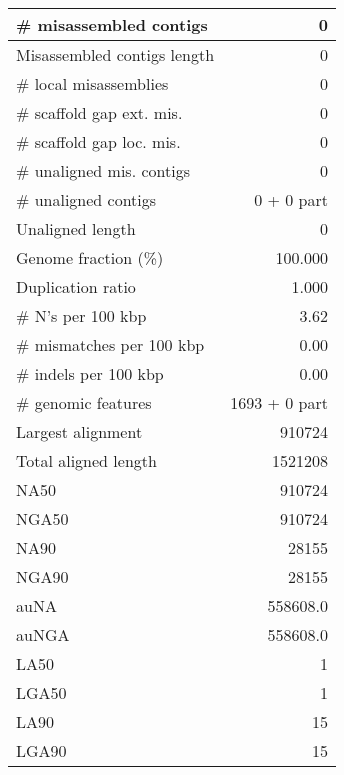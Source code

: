 \documentclass[12pt,a4paper]{article}
\begin{document}
\begin{table}[ht]
\begin{center}
\begin{tabular}{|l*{1}{|r}|}
\# misassembled contigs & 0 \\ \hline
Misassembled contigs length & 0 \\ \hline
\# local misassemblies & 0 \\ \hline
\# scaffold gap ext. mis. & 0 \\ \hline
\# scaffold gap loc. mis. & 0 \\ \hline
\# unaligned mis. contigs & 0 \\ \hline
\# unaligned contigs & 0 + 0 part \\ \hline
Unaligned length & 0 \\ \hline
Genome fraction (\%) & 100.000 \\ \hline
Duplication ratio & 1.000 \\ \hline
\# N's per 100 kbp & 3.62 \\ \hline
\# mismatches per 100 kbp & 0.00 \\ \hline
\# indels per 100 kbp & 0.00 \\ \hline
\# genomic features & 1693 + 0 part \\ \hline
Largest alignment & 910724 \\ \hline
Total aligned length & 1521208 \\ \hline
NA50 & 910724 \\ \hline
NGA50 & 910724 \\ \hline
NA90 & 28155 \\ \hline
NGA90 & 28155 \\ \hline
auNA & 558608.0 \\ \hline
auNGA & 558608.0 \\ \hline
LA50 & 1 \\ \hline
LGA50 & 1 \\ \hline
LA90 & 15 \\ \hline
LGA90 & 15 \\ \hline
\end{tabular}
\end{center}
\end{table}
\end{document}
